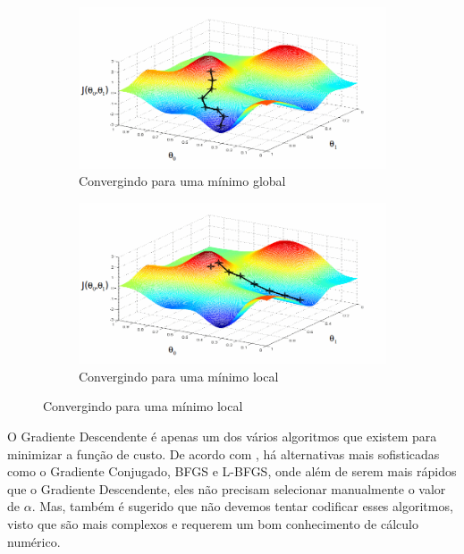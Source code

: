\begin{figure}
  \caption{Funcionamento do Gradiente Descendente}
  \begin{subfigure}[htb]{0.5\textwidth} 
    \includegraphics[width=\textwidth]{img/funcgraddesc1}
    \caption{Convergindo para uma mínimo global} \label{fig:funcgraddesc}
  \end{subfigure}
  \begin{subfigure}[htb]{0.5\textwidth} 
    \includegraphics[width=\textwidth]{img/funcgraddesc2}
    \caption{Convergindo para uma mínimo local} \label{fig:funcgraddescnot}
  \end{subfigure}

\end{figure}

O Gradiente Descendente é apenas um dos vários algoritmos que existem para minimizar a função de custo. De acordo com \cite{machinelearningcoursera}, há alternativas mais sofisticadas como o Gradiente Conjugado, BFGS e L-BFGS, onde além de serem mais rápidos que o Gradiente Descendente, eles não precisam selecionar manualmente o valor de $\alpha$. Mas, também é sugerido que não devemos tentar codificar esses algoritmos, visto que são mais complexos e requerem um bom conhecimento de cálculo numérico.


